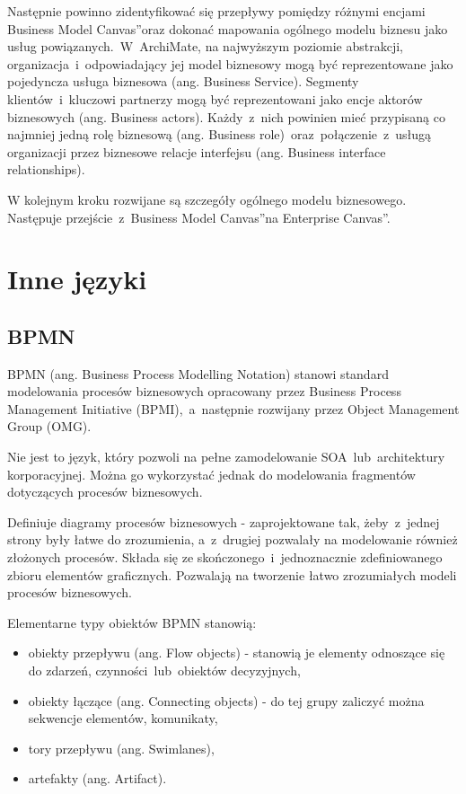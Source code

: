 Następnie powinno zidentyfikować się przepływy pomiędzy różnymi encjami \quotedblbase Business Model Canvas\textquotedblright oraz dokonać mapowania ogólnego modelu biznesu jako usług powiązanych.~W~ArchiMate, na najwyższym poziomie abstrakcji, organizacja~i~odpowiadający jej model biznesowy mogą być reprezentowane jako pojedyncza usługa biznesowa (ang. Business Service). Segmenty klientów~i~kluczowi partnerzy mogą być reprezentowani jako encje aktorów biznesowych (ang. Business actors). Każdy~z~nich powinien mieć przypisaną co najmniej jedną rolę biznesową (ang. Business role)~oraz~połączenie~z~usługą organizacji przez biznesowe relacje interfejsu (ang. Business interface relationships).

W kolejnym kroku rozwijane są szczegóły ogólnego modelu biznesowego. Następuje przejście~z~\quotedblbase Business Model Canvas\textquotedblright na \quotedblbase Enterprise Canvas\textquotedblright. 


\section{Inne języki}

\subsection{BPMN}
BPMN (ang. Business Process Modelling Notation) stanowi standard modelowania procesów biznesowych opracowany przez Business Process Management Initiative (BPMI),~a~następnie rozwijany przez Object Management Group (OMG). 

Nie jest to język, który pozwoli na pełne zamodelowanie SOA~lub~architektury korporacyjnej. Można go wykorzystać jednak do modelowania fragmentów dotyczących procesów biznesowych.

Definiuje diagramy procesów biznesowych - zaprojektowane tak, żeby~z~jednej strony były łatwe do zrozumienia, a~z~drugiej pozwalały na modelowanie również złożonych procesów. Składa się ze skończonego~i~jednoznacznie zdefiniowanego zbioru elementów graficznych. Pozwalają na tworzenie łatwo zrozumiałych  modeli procesów biznesowych.

Elementarne typy obiektów BPMN stanowią: 
\begin{itemize}
\item{obiekty przepływu (ang. Flow objects) - stanowią je elementy odnoszące się do zdarzeń, czynności~lub~obiektów decyzyjnych,}
\item{obiekty łączące (ang. Connecting objects) - do tej grupy zaliczyć można sekwencje elementów, komunikaty,} 
\item{tory przepływu (ang. Swimlanes),}
\item{artefakty (ang. Artifact).}
\end{itemize}

